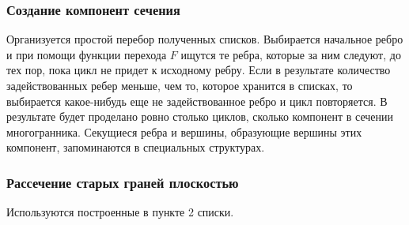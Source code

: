 \documentclass[a4paper,12pt, titlepage]{article}
\begin{document}
\subsubsection{Создание компонент сечения}	
	\begin{flushleft}
		Организуется простой перебор полученных списков. Выбирается начальное ребро и при помощи 
		функции перехода $F$ ищутся те ребра, которые за ним следуют, до тех пор, пока цикл не придет
		к исходному ребру. Если в результате количество задействованных ребер меньше, чем то, которое
		хранится в списках, то выбирается какое-нибудь еще не задействованное ребро и цикл 
		повторяется. В результате будет проделано ровно столько циклов, сколько компонент в сечении
		многогранника. Секущиеся ребра и вершины, образующие вершины этих компонент, запоминаются в 
		специальных структурах.
	\end{flushleft}

\subsubsection{Рассечение старых граней плоскостью}	
	\begin{flushleft}
		Используются построенные в пункте 2 списки.
	\end{flushleft}
\end{document}

